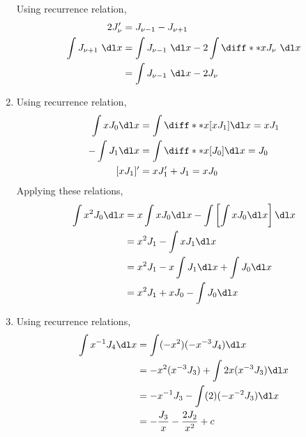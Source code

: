 \begin{enumerate}
          Using recurrence relation,
          \begin{align}
              2J_{\nu}'             & = J_{\nu-1} - J_{\nu+1} \\
              \int J_{\nu+1}\ \dl x & = \int J_{\nu-1}\ \dl x
              - 2\int \diff**{x}{J_{\nu}}\ \dl x              \\
                                    & = \int J_{\nu-1}\ \dl x
              - 2J_{\nu}                                      \\
          \end{align}

    \item Using recurrence relation,
          \begin{align}
              \int xJ_0 \dl x & = \int \diff**{x}{[xJ_1]} \dl x  = xJ_1 \\
              -\int J_1 \dl x & = \int \diff**{x}{[J_0]} \dl x  = J_0   \\
              [xJ_1]'         & = xJ_1' + J_1 = xJ_0                    \\
          \end{align}
          Applying these relations,
          \begin{align}
              \int x^2 J_0 \dl x & = x \int xJ_0 \dl x
              - \int \left[  \int xJ_0 \dl x \right] \dl x                       \\
                                 & = x^2 J_1 - \int x J_1 \dl x                  \\
                                 & = x^2 J_1 - x \int J_1 \dl x + \int J_0 \dl x \\
                                 & = x^2 J_1 + xJ_0 - \int J_0 \dl x             \\
          \end{align}

    \item Using recurrence relations,
          \begin{align}
              \int x^{-1}J_4 \dl x & = \int (-x^2)(-x^{-3}J_4) \dl x                \\
                                   & = -x^2 (x^{-3}J_3) + \int 2x (x^{-3}J_3) \dl x \\
                                   & = -x^{-1}J_3 - \int (2)(-x^{-2}J_3) \dl x      \\
                                   & = -\frac{J_3}{x} - \frac{2J_2}{x^2} + c
          \end{align}


\end{enumerate}
